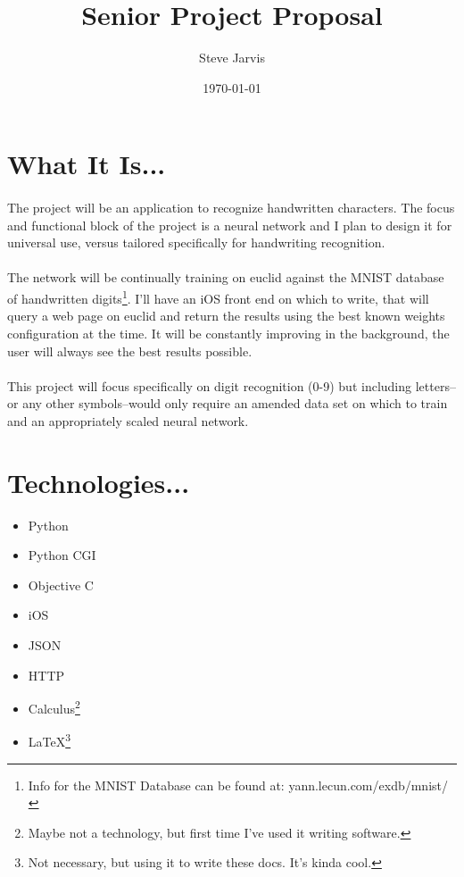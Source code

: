 \documentclass{article}
\title{Senior Project Proposal}
\author{Steve Jarvis}
\date{\today}
\begin{document}
\maketitle

\section{What It Is...}
	\paragraph{}The project will be an application to recognize handwritten characters.  The
	focus and functional block of the project is a neural network and I plan to 
	design it for universal use, versus tailored specifically for handwriting 
	recognition.
	\paragraph{}The network will be continually training on euclid against the MNIST database
	of handwritten digits\footnote{Info for the MNIST Database can be found at: 
	yann.lecun.com/exdb/mnist/}. I'll have an iOS front end on which to write, 
	that will query a web page on euclid and return the results using the best 
	known weights configuration at the time. It will be constantly improving in 
	the background, the user will always see the best results possible.
	\paragraph{}This project will focus specifically on digit recognition (0-9) but including 
	letters--or any other symbols--would only require an amended data set on which
	to train and an appropriately scaled neural network.
	
\section{Technologies...}
	\begin{itemize}
		\item Python
		\item Python CGI
		\item Objective C
		\item iOS
		\item JSON
		\item HTTP
		\item Calculus\footnote{Maybe not a technology, but first time I’ve used it writing software.}
		\item \LaTeX\footnote{Not necessary, but using it to write these docs. It's kinda cool.}
	\end{itemize}
	
\end{document}
